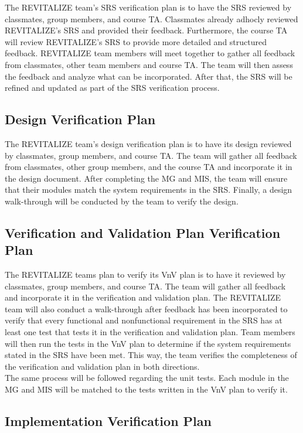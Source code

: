 \documentclass[12pt, titlepage]{article}
\begin{document}
The REVITALIZE team's SRS verification plan is to have the SRS reviewed by classmates, group members, and course TA. Classmates already adhocly reviewed REVITALIZE's SRS and provided their feedback. Furthermore, the course TA will review REVITALIZE's SRS to provide more detailed and structured feedback. REVITALIZE team members will meet together to gather all feedback from classmates, other team members and course TA. The team will then assess the feedback and analyze what can be incorporated. After that, the SRS will be refined and updated as part of the SRS verification process.

\subsection{Design Verification Plan}

The REVITALIZE team's design verification plan is to have its design reviewed by classmates, group members, and course TA. The team will gather all feedback from classmates, other group members, and the course TA and incorporate it in the design document. After completing the MG and MIS, the team will ensure that their modules match the system requirements in the SRS. Finally, a design walk-through will be conducted by the team to verify the design.

\subsection{Verification and Validation Plan Verification Plan}

The REVITALIZE teams plan to verify its VnV plan is to have it reviewed by classmates, group members, and course TA. The team will gather all feedback and incorporate it in the verification and validation plan. The REVITALIZE team will also conduct a walk-through after feedback has been incorporated to verify that every functional and nonfunctional requirement in the SRS has at least one test that tests it in the verification and validation plan. Team members will then run the tests in the VnV plan to determine if the system requirements stated in the SRS have been met. This way, the team verifies the completeness of the verification and validation plan in both directions.\\
The same process will be followed regarding the unit tests. Each module in the MG and MIS will be matched to the tests written in the VnV plan to verify it.

\subsection{Implementation Verification Plan}
\end{document}
